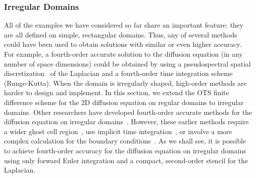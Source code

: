\documentclass[fleqn,12pt,twoside]{article}
\begin{document}
\subsubsection{Irregular Domains}
All of the examples we have considered so far share an important feature: they 
are all defined on simple, rectangular domains.  Thus, any of several methods 
could have been used to obtain solutions with similar or even higher accuracy.
For example, a fourth-order accurate solution to the diffusion equation
(in any number of space dimensions) could be obtained by using a 
pseudospectral spatial 
discretization~\cite{trefethen_spectral_book,boyd_spectral_book} 
of the Laplacian and a fourth-order time integration scheme 
(\eg Runge-Kutta).  When the domain is irregularly shaped, high-order methods 
are harder to design and implement.  
In this section, we extend the OTS finite difference scheme for the 2D 
diffusion equation on regular domains to irregular domains.  Other 
researchers have developed fourth-order accurate methods for the diffusion 
equation on irregular domains~\cite{gibou_2005,ito_2005}.  However, these 
earlier methods require a wider ghost cell region~\cite{gibou_2005}, use
implicit time integration~\cite{gibou_2005,ito_2005}, or involve a more 
complex calculation for the boundary conditions~\cite{ito_2005}.  As we shall 
see, it is possible to achieve fourth-order accuracy for the diffusion 
equation on irregular domains using only forward Euler integration and a 
compact, second-order stencil for the Laplacian.
\end{document}
